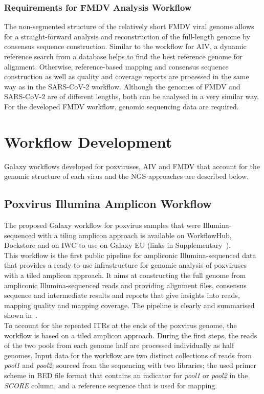 \subsubsection{Requirements for FMDV Analysis Workflow}
The non-segmented structure of the relatively short \ac{FMDV} viral genome allows for a straight-forward analysis and reconstruction of the full-length genome by consensus sequence construction. Similar to the workflow for \ac{AIV}, a dynamic reference search from a database helps to find the best reference genome for alignment. Otherwise, reference-based mapping and consensus sequence construction as well as quality and coverage reports are processed in the same way as in the \ac{SARS-CoV-2} workflow. Although the genomes of \ac{FMDV} and \ac{SARS-CoV-2} are of different lengths, both can be analysed in a very similar way. For the developed \ac{FMDV} workflow, genomic sequencing data are required.

\section{Workflow Development}
Galaxy workflows developed for poxviruses, \ac{AIV} and \ac{FMDV} that account for the genomic structure of each virus and the \ac{NGS} approaches are described below.

\subsection{Poxvirus Illumina Amplicon Workflow}\label{sec:pox-wf}
The proposed Galaxy workflow for poxvirus samples that were Illumina-sequenced with a tiling amplicon approach is available on WorkflowHub, Dockstore and on \ac{IWC} to use on Galaxy EU (links in Supplementary~). \\
This workflow is the first public pipeline for ampliconic Illumina-sequenced data that provides a ready-to-use infrastructure for genomic analysis of poxviruses with a tiled amplicon approach. It aims at constructing the full genome from ampliconic Illumina-sequenced reads and providing alignment files, consensus sequence and intermediate results and reports that give insights into reads, mapping quality and mapping coverage. %
The pipeline is clearly and summarised shown in~. \\ 
To account for the repeated \acp{ITR} at the ends of the poxvirus genome, the workflow is based on a tiled amplicon approach. During the first steps, the reads of the two pools from each genome half are processed individually as half genomes. Input data for the workflow are two distinct collections of reads from \textit{pool1} and \textit{pool2}, sourced from the sequencing with two libraries; the used primer scheme in \ac{BED} file format that contains an indicator for \textit{pool1} or \textit{pool2} in the \textit{SCORE} column, and a reference sequence that is used for mapping. 

